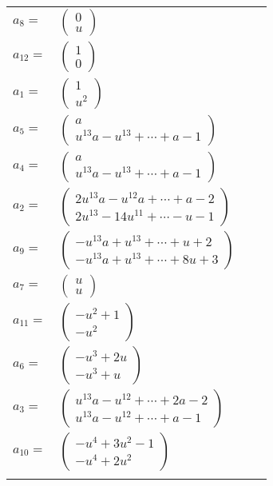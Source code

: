 \documentclass[1p]{elsarticle_modified}
\theoremstyle{definition}
\begin{document}
\begin{tabular}{m{7pt} m{180pt} m{7pt} m{180pt} }
\flushright $a_{8}=$&$\begin{pmatrix}0\\u\end{pmatrix}$ \\
\flushright $a_{12}=$&$\begin{pmatrix}1\\0\end{pmatrix}$ \\
\flushright $a_{1}=$&$\begin{pmatrix}1\\u^2\end{pmatrix}$ \\
\flushright $a_{5}=$&$\begin{pmatrix}a\\u^{13} a- u^{13}+\cdots+a-1\end{pmatrix}$ \\
\flushright $a_{4}=$&$\begin{pmatrix}a\\u^{13} a- u^{13}+\cdots+a-1\end{pmatrix}$ \\
\flushright $a_{2}=$&$\begin{pmatrix}2 u^{13} a- u^{12} a+\cdots+a-2\\2 u^{13}-14 u^{11}+\cdots- u-1\end{pmatrix}$ \\
\flushright $a_{9}=$&$\begin{pmatrix}- u^{13} a+u^{13}+\cdots+u+2\\- u^{13} a+u^{13}+\cdots+8 u+3\end{pmatrix}$ \\
\flushright $a_{7}=$&$\begin{pmatrix}u\\u\end{pmatrix}$ \\
\flushright $a_{11}=$&$\begin{pmatrix}- u^2+1\\- u^2\end{pmatrix}$ \\
\flushright $a_{6}=$&$\begin{pmatrix}- u^3+2 u\\- u^3+u\end{pmatrix}$ \\
\flushright $a_{3}=$&$\begin{pmatrix}u^{13} a- u^{12}+\cdots+2 a-2\\u^{13} a- u^{12}+\cdots+a-1\end{pmatrix}$ \\
\flushright $a_{10}=$&$\begin{pmatrix}- u^4+3 u^2-1\\- u^4+2 u^2\end{pmatrix}$\\&\end{tabular}
\end{document}
